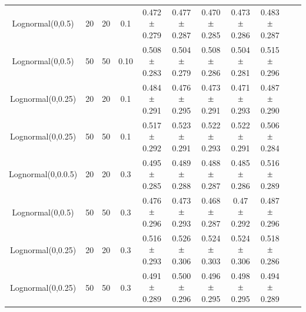 \documentclass[11pt]{article}
\newcommand{\Mypm}{\mathbin{\tikz [x=1.4ex,y=1.4ex,line width=.1ex] \draw (0.0,0) -- (1.0,0) (0.5,0.08) -- (0.5,0.92) (0.0,0.5) -- (1.0,0.5);}}
\begin{document}
\begin{appendices}
\begin{table}[H]
{\begin{tabular}{ccccccccccc}
							\\
							
							\hline	 
							Lognormal(0,0.5) & 20 &	20 & 0.1  & 0.472 $\Mypm$   0.279 & 0.477 $\Mypm$   0.287 & 0.470 $\Mypm$   0.285 & 0.473 $\Mypm$   0.286 & 0.483 $\Mypm$   0.287 \\ 
							Lognormal(0,0.5) & 50 &	50 & 0.10  & 0.508 $\Mypm$   0.283 & 0.504 $\Mypm$   0.279 & 0.508 $\Mypm$   0.286 & 0.504 $\Mypm$   0.281 & 0.515 $\Mypm$   0.296 \\ 
							Lognormal(0,0.25) & 20 & 20 & 0.1  & 0.484 $\Mypm$   0.291 & 0.476 $\Mypm$  0.295 & 0.473 $\Mypm$   0.291 & 0.471 $\Mypm$   0.293 & 0.487 $\Mypm$   0.290 \\ 
							Lognormal(0,0.25) & 50 & 50 & 0.1 & 0.517 $\Mypm$   0.292 & 0.523 $\Mypm$  0.291 & 0.522 $\Mypm$   0.293 & 0.522 $\Mypm$   0.291 & 0.506 $\Mypm$   0.284 \\ 
							Lognormal(0,0.0.5) & 20 & 20 & 0.3   &  0.495 $\Mypm$   0.285 & 0.489 $\Mypm$  0.288 & 0.488 $\Mypm$   0.287 & 0.485 $\Mypm$  0.286 & 0.516 $\Mypm$   0.289 \\ 
							Lognormal(0,0.5) & 50 &	50 & 0.3  & 0.476 $\Mypm$   0.296 & 0.473 $\Mypm$   0.293 & 0.468 $\Mypm$   0.287 & 0.47 $\Mypm$   0.292 & 0.487 $\Mypm$   0.296 \\ 
							Lognormal(0,0.25) & 20 & 20 & 0.3  & 0.516 $\Mypm$   0.293 & 0.526 $\Mypm$   0.306 & 0.524 $\Mypm$   0.303 & 0.524 $\Mypm$   0.306 & 0.518 $\Mypm$   0.286 \\ 
							Lognormal(0,0.25) & 50 & 50 & 0.3  & 0.491 $\Mypm$   0.289 & 0.500 $\Mypm$   0.296 & 0.496 $\Mypm$   0.295 & 0.498 $\Mypm$   0.295 & 0.494 $\Mypm$   0.289 \\ 
							\hline
							
							
							
						\end{tabular}}
						
						
						

\end{table}
\end{appendices}
\end{document}
